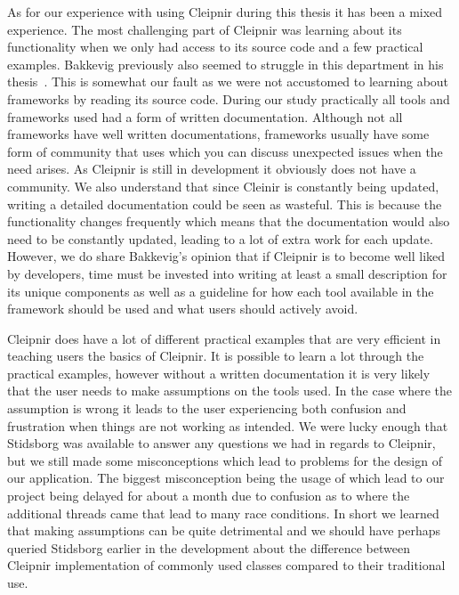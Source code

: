 As for our experience with using Cleipnir during this thesis it has been a mixed experience. The most challenging part of Cleipnir was learning about its functionality when we only had access to its source code and a few practical examples. Bakkevig previously also seemed to struggle in this department in his thesis~\cite[p.~43-44]{PAPER:EivindPaper}. This is somewhat our fault as we were not accustomed to learning about frameworks by reading its source code. During our study practically all tools and frameworks used had a form of written documentation. Although not all frameworks have well written documentations, frameworks usually have some form of community that uses which you can discuss unexpected issues when the need arises. As Cleipnir is still in development it obviously does not have a community. We also understand that since Cleinir is constantly being updated, writing a detailed documentation could be seen as wasteful. This is because the functionality changes frequently which means that the documentation would also need to be constantly updated, leading to a lot of extra work for each update. However, we do share Bakkevig's opinion that if  Cleipnir is to become well liked by developers, time must be invested into writing at least a small description for its unique components as well as a guideline for how each tool available in the framework should be used and what users should actively avoid. 

Cleipnir does have a lot of different practical examples that are very efficient in teaching users the basics of Cleipnir. It is possible to learn a lot through the practical examples, however without a written documentation it is very likely that the user needs to make assumptions on the tools used. In the case where the assumption is wrong it leads to the user experiencing both confusion and frustration when things are not working as intended. We were lucky enough that Stidsborg was available to answer any questions we had in regards to Cleipnir, but we still made some misconceptions which lead to problems for the design of our application. The biggest misconception being the usage of  which lead to our project being delayed for about a month due to confusion as to where the additional threads came that lead to many race conditions.   In short we learned that making assumptions can be quite detrimental and we should have perhaps queried Stidsborg earlier in the development about the difference between Cleipnir implementation of commonly used classes compared to their traditional use. 